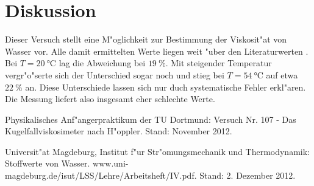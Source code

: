 \newpage
\section{Diskussion}
	\label{sec:diskussion}
	Dieser Versuch stellt eine M"oglichkeit zur Bestimmung der Viskosit"at von Wasser vor.
	Alle damit ermittelten Werte liegen weit "uber den Literaturwerten \cite{uni_magdeburg}.
	Bei $T = \SI{20}{\celsius}$ lag die Abweichung bei $\SI{19}{\percent}$.
	Mit steigender Temperatur vergr"o"serte sich der Unterschied sogar noch und stieg bei $T = \SI{54}{\celsius}$ auf etwa $\SI{22}{\percent}$ an.
	Diese Unterschiede lassen sich nur duch systematische Fehler erkl"aren.
	Die Messung liefert also insgesamt eher schlechte Werte.	

\begin{thebibliography}{9}
	 Physikalisches Anf"angerpraktikum der TU Dortmund: Versuch Nr. 107 - Das Kugelfallviskosimeter nach H"oppler. Stand: November 2012.

	 Universit"at Magdeburg, Institut f"ur Str"omungsmechanik und Thermodynamik: Stoffwerte von Wasser. www.uni-magdeburg.de/isut/LSS/Lehre/Arbeitsheft/IV.pdf. Stand: 2. Dezember 2012.
\end{thebibliography}